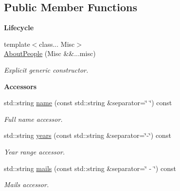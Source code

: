 \subsection*{Public Member Functions}
\begin{Indent}{\bf Lifecycle}\par
\begin{DoxyCompactItemize}
\item 
{\footnotesize template$<$class... Misc$>$ }\\\hyperlink{exceptionmagrathea_1_1AboutPeople_a5fe4a557c836654303aa03a6acf557ad}{About\-People} (Misc \&\&...misc)
\begin{DoxyCompactList}\small\item\em Explicit generic constructor. \end{DoxyCompactList}\end{DoxyCompactItemize}
\end{Indent}
\begin{Indent}{\bf Accessors}\par
\begin{DoxyCompactItemize}
\item 
std\-::string \hyperlink{exceptionmagrathea_1_1AboutPeople_abe6f425a7403a8cd81db4c7741f9003d}{name} (const std\-::string \&separator=\char`\"{} \char`\"{}) const 
\begin{DoxyCompactList}\small\item\em Full name accessor. \end{DoxyCompactList}\item 
std\-::string \hyperlink{exceptionmagrathea_1_1AboutPeople_aad3837d6066fe41ade77cfe80797c56a}{years} (const std\-::string \&separator=\char`\"{}-\/\char`\"{}) const 
\begin{DoxyCompactList}\small\item\em Year range accessor. \end{DoxyCompactList}\item 
std\-::string \hyperlink{exceptionmagrathea_1_1AboutPeople_ac0d1d6d5a7189457a1eb8bbe716aaeef}{mails} (const std\-::string \&separator=\char`\"{} -\/ \char`\"{}) const 
\begin{DoxyCompactList}\small\item\em Mails accessor. \end{DoxyCompactList}\end{DoxyCompactItemize}
\end{Indent}
